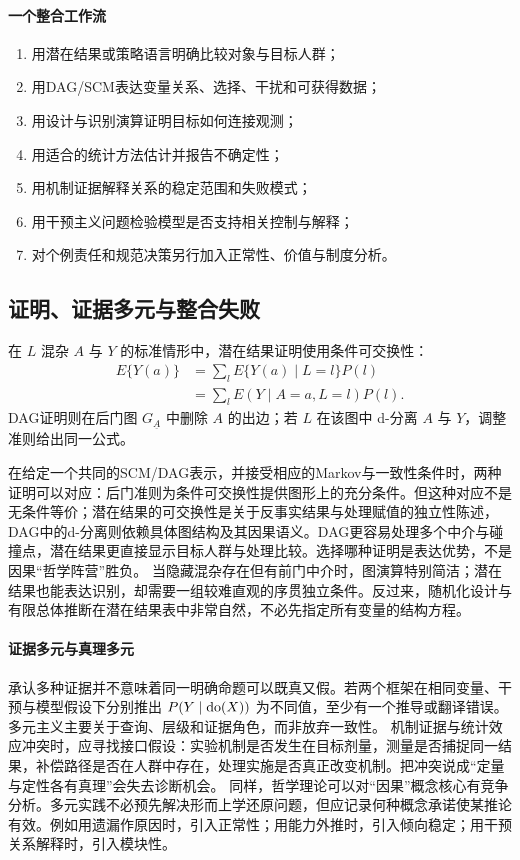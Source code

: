 \paragraph{一个整合工作流}

\begin{enumerate}
  \item 用潜在结果或策略语言明确比较对象与目标人群；
  \item 用DAG/SCM表达变量关系、选择、干扰和可获得数据；
  \item 用设计与识别演算证明目标如何连接观测；
  \item 用适合的统计方法估计并报告不确定性；
  \item 用机制证据解释关系的稳定范围和失败模式；
  \item 用干预主义问题检验模型是否支持相关控制与解释；
  \item 对个例责任和规范决策另行加入正常性、价值与制度分析。
\end{enumerate}

\subsection{证明、证据多元与整合失败}

在 $L$ 混杂 $A$ 与 $Y$ 的标准情形中，潜在结果证明使用条件可交换性：
\begin{align*}
E\{Y(a)\}
&=\sum_l E\{Y(a)\mid L=l\}P(l)\\
&=\sum_l E(Y\mid A=a,L=l)P(l).
\end{align*}
DAG证明则在后门图 $G_{\underline A}$ 中删除 $A$ 的出边；若 $L$ 在该图中 d-分离 $A$ 与 $Y$，调整准则给出同一公式。

在给定一个共同的SCM/DAG表示，并接受相应的Markov与一致性条件时，两种证明可以对应：后门准则为条件可交换性提供图形上的充分条件。但这种对应不是无条件等价；潜在结果的可交换性是关于反事实结果与处理赋值的独立性陈述，DAG中的d-分离则依赖具体图结构及其因果语义。DAG更容易处理多个中介与碰撞点，潜在结果更直接显示目标人群与处理比较。选择哪种证明是表达优势，不是因果“哲学阵营”胜负。
当隐藏混杂存在但有前门中介时，图演算特别简洁；潜在结果也能表达识别，却需要一组较难直观的序贯独立条件。反过来，随机化设计与有限总体推断在潜在结果表中非常自然，不必先指定所有变量的结构方程。

\paragraph{证据多元与真理多元}

承认多种证据并不意味着同一明确命题可以既真又假。若两个框架在相同变量、干预与模型假设下分别推出 $P(Y\mid\operatorname{do}(X))$ 为不同值，至少有一个推导或翻译错误。多元主义主要关于查询、层级和证据角色，而非放弃一致性。
机制证据与统计效应冲突时，应寻找接口假设：实验机制是否发生在目标剂量，测量是否捕捉同一结果，补偿路径是否在人群中存在，处理实施是否真正改变机制。把冲突说成“定量与定性各有真理”会失去诊断机会。
同样，哲学理论可以对“因果”概念核心有竞争分析。多元实践不必预先解决形而上学还原问题，但应记录何种概念承诺使某推论有效。例如用遗漏作原因时，引入正常性；用能力外推时，引入倾向稳定；用干预关系解释时，引入模块性。

